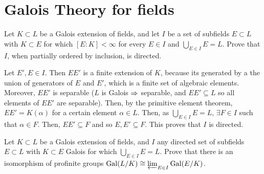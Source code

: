 \section{Galois Theory for fields}

\begin{ex}
	Let $K \subset L$ be a Galois extension of fields, and let $I$ be a set of subfields $E \subset L$ with $K \subset E$ for which $[E:K] < \infty$ for every $E \in I$ and $\bigcup_{E \in I}  E = L$. Prove that $I$, when partially ordered by inclusion, is directed. 
\end{ex}

\begin{sol}
	Let $E',E \in I$. Then $EE'$ is a finite extension of $K$, because its generated by a the union of generators of $E$ and $E'$, which is a finite set of algebraic elements. Moreover, $EE'$ is separable ($L$ is Galois $\Rightarrow$ separable, and $EE' \subseteq L$ so all elements of $EE'$ are separable). Then, by the primitive element theorem, $EE' = K(\alpha)$ for a certain element $\alpha \in L$. Then, as $\bigcup_{E \in I} E = L$, $\exists F \in I$ such that $\alpha \in F$. Then, $EE' \subseteq F$ and so $E, E' \subseteq F$. This proves that $I$ is directed.
\end{sol}

\begin{ex}
	Let $K \subset L$ be a Galois extension of fields, and $I$ any directed set of subfields $E \subset L$ with $K \subset E$ Galois for which $\bigcup_{E \in I} E = L$. Prove that there is an isomorphism of profinite groups $\mathrm{Gal}(L/K) \cong \varprojlim_{E \in I} \mathrm{Gal}(E/K)$.
\end{ex}

